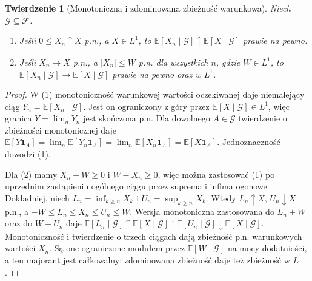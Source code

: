 \documentclass[11pt,a4paper,oneside]{report}
\numberwithin{equation}{chapter}
\theoremstyle{plain}
\newtheorem{twierdzenie}{Twierdzenie}[chapter]
\theoremstyle{definition}
\theoremstyle{remark}
\newcommand{\E}{\mathbb{E}}
\newcommand{\ind}[1]{\mathbf{1}_{#1}}
\begin{document}
\begin{twierdzenie}[Monotoniczna i zdominowana zbieżność warunkowa]
Niech $\mathcal G\subseteq\mathcal F$.
\begin{enumerate}
\item Jeśli $0\leq X_n\uparrow X$ p.n., a $X\in L^1$,
to $\E[X_n\mid\mathcal G]\uparrow\E[X\mid\mathcal G]$
prawie na pewno.
\item Jeśli $X_n\to X$ p.n., a $|X_n|\leq W$
p.n. dla wszystkich $n$, gdzie $W\in L^1$, to
$\E[X_n\mid\mathcal G]\to\E[X\mid\mathcal G]$
prawie na pewno oraz w $L^1$.
\end{enumerate}
\end{twierdzenie}
\begin{proof}
W (1) monotoniczność warunkowej wartości oczekiwanej
daje niemalejący ciąg $Y_n=\E[X_n\mid\mathcal G]$.
Jest on ograniczony z góry przez
$\E[X\mid\mathcal G]\in L^1$, więc granica
$Y=\lim_nY_n$ jest skończona p.n. Dla dowolnego
$A\in\mathcal G$ twierdzenie o zbieżności monotonicznej
daje
$\E[Y\ind A]=\lim_n\E[Y_n\ind A]
=\lim_n\E[X_n\ind A]=\E[X\ind A]$.
Jednoznaczność dowodzi (1).

Dla (2) mamy $X_n+W\geq0$ i $W-X_n\geq0$,
więc można zastosować (1) po uprzednim zastąpieniu
ogólnego ciągu przez suprema i infima ogonowe.
Dokładniej, niech
$L_n=\inf_{k\geq n}X_k$ i
$U_n=\sup_{k\geq n}X_k$. Wtedy
$L_n\uparrow X$, $U_n\downarrow X$ p.n., a
$-W\leq L_n\leq X_n\leq U_n\leq W$.
Wersja monotoniczna zastosowana do $L_n+W$ oraz
do $W-U_n$ daje
$\E[L_n\mid\mathcal G]\uparrow\E[X\mid\mathcal G]$
i $\E[U_n\mid\mathcal G]\downarrow\E[X\mid\mathcal G]$.
Monotoniczność i twierdzenie o trzech ciągach
dają zbieżność p.n. warunkowych wartości $X_n$.
Są one ograniczone modułem przez $\E[W\mid\mathcal G]$
na mocy dodatniości, a ten majorant jest całkowalny;
zdominowana zbieżność daje też zbieżność w $L^1$.
\end{proof}
\end{document}

